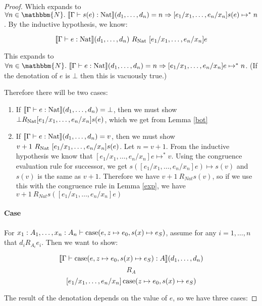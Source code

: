 \begin{proof}
Which expands to $\forall n \in \mathbbm{N}. \ \llbracket \Gamma \vdash s(e) : \nat \rrbracket (d_1, \dots, d_n) = n \Rightarrow [e_1/x_1, \dots, e_n/x_n]s(e) \mapsto^* n $. By the inductive hypothesis, we know:

\[ \llbracket \Gamma \vdash e : \operatorname{Nat} \rrbracket (d_1, \dots, d_n) \ R_{\operatorname{Nat}} \ [e_1/x_1, \dots, e_n/x_n]e \]

This expands to $\forall n \in \mathbbm{N}. \ \llbracket \Gamma \vdash e : \nat \rrbracket (d_1, \dots, d_n) = n \Rightarrow [e_1/x_1, \dots, e_n/x_n]e \mapsto^* n $. (If the denotation of $e$ is $\bot$ then this is vacuously true.)

Therefore there will be two cases:

\begin{enumerate}
\item{If $\llbracket \Gamma \vdash e : \operatorname{Nat} \rrbracket (d_1, \dots, d_n) = \bot$, then we must show $\bot R_{\operatorname{Nat}} [e_1/x_1, \dots, e_n/x_n]s(e)$, which we get from Lemma \ref{bot}}%
\item{If $\llbracket \Gamma \vdash e : \operatorname{Nat} \rrbracket (d_1, \dots, d_n) = v$, then we must show $v+1 \ R_{\operatorname{Nat}} \ [e_1/x_1, \dots, e_n/x_n]s(e)$. Let $n = v + 1$. From the inductive hypothesis we know that $[e_1/x_1, \dots, e_n/x_n]e \mapsto^* v$. Using the congruence evaluation rule for successor, we get $s([e_1/x_1, \dots, e_n/x_n]e) \mapsto s(v)$ and $s(v)$ is the same as $v+1$. Therefore we have $v + 1 \ R_{Nat} s(v)$, so if we use this with the congruence rule in Lemma \ref{exp}, we have  $v + 1 \ R_{Nat} s([e_1/x_1, \dots, e_n/x_n]e)$ }
\end{enumerate}

\paragraph{Case} For $x_1 : A_1, \dots, x_n : A_n \vdash \operatorname{case} (e,z \mapsto e_0, s(x) \mapsto e_S)$, assume for any $i = 1, \dots, n$ that $d_i R_{A_i} e_i$. Then we want to show:


\[ \llbracket \Gamma \vdash \operatorname{case}(e,z \mapsto e_0, s(x) \mapsto e_S) : A \rrbracket (d_1, \dots, d_n) \]
\[ R_A \]
\[ [e_1/x_1, \dots, e_n/x_n]\operatorname{case} (z \mapsto e_0, s(x) \mapsto e_S) \]

The result of the denotation depends on the value of $e$, so we have three cases:


\end{proof}
